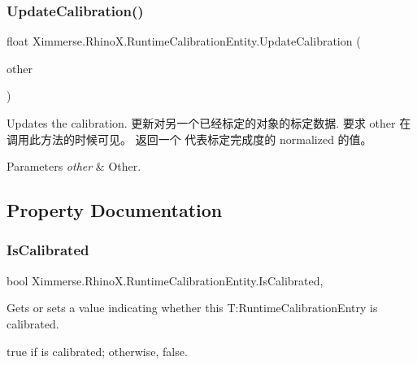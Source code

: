 \subsubsection{\texorpdfstring{Update\+Calibration()}{UpdateCalibration()}}
{\footnotesize\ttfamily float Ximmerse.\+Rhino\+X.\+Runtime\+Calibration\+Entity.\+Update\+Calibration (\begin{DoxyParamCaption}\item[{\mbox{\hyperlink{class_ximmerse_1_1_rhino_x_1_1_runtime_calibration_entity}{Runtime\+Calibration\+Entity}}}]{other }\end{DoxyParamCaption})\hspace{0.3cm}{\ttfamily [inline]}}



Updates the calibration. 更新对另一个已经标定的对象的标定数据. 要求 other 在调用此方法的时候可见。 返回一个 代表标定完成度的 normalized 的值。 


\begin{DoxyParams}{Parameters}
{\em other} & Other.\\
\hline
\end{DoxyParams}


\subsection{Property Documentation}
\mbox{\label{class_ximmerse_1_1_rhino_x_1_1_runtime_calibration_entity_a4089f89a884f71bd451b27d38ab978d0}} 
\subsubsection{\texorpdfstring{Is\+Calibrated}{IsCalibrated}}
{\footnotesize\ttfamily bool Ximmerse.\+Rhino\+X.\+Runtime\+Calibration\+Entity.\+Is\+Calibrated\hspace{0.3cm}{\ttfamily [get]}, {\ttfamily [set]}}



Gets or sets a value indicating whether this T\+:\+Runtime\+Calibration\+Entry is calibrated. 

{\ttfamily true} if is calibrated; otherwise, {\ttfamily false}.\mbox{\label{class_ximmerse_1_1_rhino_x_1_1_runtime_calibration_entity_ad9cfbd99981ebb2a69e1c5e8d6f5c92d}} 
